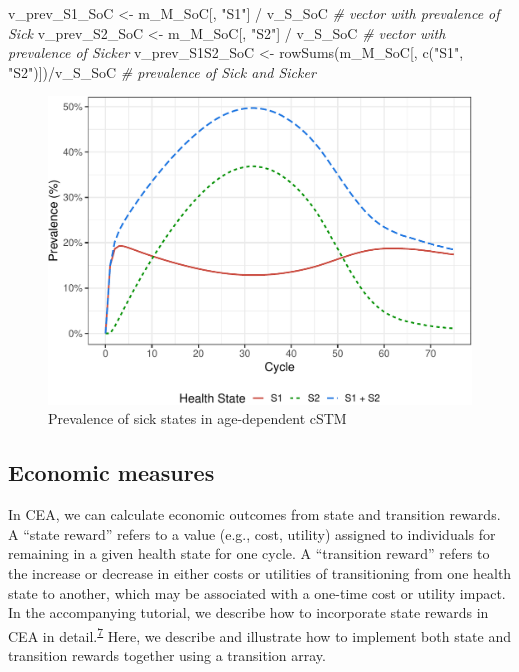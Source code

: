 \documentclass[
]{article}
\newenvironment{Shaded}{\begin{snugshade}}{\end{snugshade}}
\newcommand{\CommentTok}[1]{\textcolor[rgb]{0.56,0.35,0.01}{\textit{#1}}}
\newcommand{\FunctionTok}[1]{\textcolor[rgb]{0.00,0.00,0.00}{#1}}
\newcommand{\NormalTok}[1]{#1}
\newcommand{\OtherTok}[1]{\textcolor[rgb]{0.56,0.35,0.01}{#1}}
\newcommand{\SpecialCharTok}[1]{\textcolor[rgb]{0.00,0.00,0.00}{#1}}
\newcommand{\StringTok}[1]{\textcolor[rgb]{0.31,0.60,0.02}{#1}}
\begin{document}
\begin{Shaded}
\begin{Highlighting}[]
\NormalTok{v\_prev\_S1\_SoC   }\OtherTok{\textless{}{-}}\NormalTok{ m\_M\_SoC[, }\StringTok{"S1"}\NormalTok{] }\SpecialCharTok{/}\NormalTok{ v\_S\_SoC          }\CommentTok{\# vector with prevalence of Sick}
\NormalTok{v\_prev\_S2\_SoC   }\OtherTok{\textless{}{-}}\NormalTok{ m\_M\_SoC[, }\StringTok{"S2"}\NormalTok{] }\SpecialCharTok{/}\NormalTok{ v\_S\_SoC          }\CommentTok{\# vector with prevalence of Sicker}
\NormalTok{v\_prev\_S1S2\_SoC }\OtherTok{\textless{}{-}} \FunctionTok{rowSums}\NormalTok{(m\_M\_SoC[, }\FunctionTok{c}\NormalTok{(}\StringTok{"S1"}\NormalTok{, }\StringTok{"S2"}\NormalTok{)])}\SpecialCharTok{/}\NormalTok{v\_S\_SoC }\CommentTok{\# prevalence of Sick and Sicker}
\end{Highlighting}
\end{Shaded}

\begin{figure}[H]

{\centering \includegraphics{figs/Sick-Sicker-Prev-AgeDep-1} 

}

\caption{Prevalence of sick states in age-dependent cSTM}\label{fig:Sick-Sicker-Prev-AgeDep}
\end{figure}

\hypertarget{economic-measures}{%
\subsection{Economic measures}\label{economic-measures}}

In CEA, we can calculate economic outcomes from state and transition rewards. A ``state reward'' refers to a value (e.g., cost, utility) assigned to individuals for remaining in a given health state for one cycle. A ``transition reward'' refers to the increase or decrease in either costs or utilities of transitioning from one health state to another, which may be associated with a one-time cost or utility impact. In the accompanying tutorial, we describe how to incorporate state rewards in CEA in detail.\textsuperscript{\protect\hyperlink{ref-Alarid-Escudero2021a}{7}} Here, we describe and illustrate how to implement both state and transition rewards together using a transition array.
\end{document}
